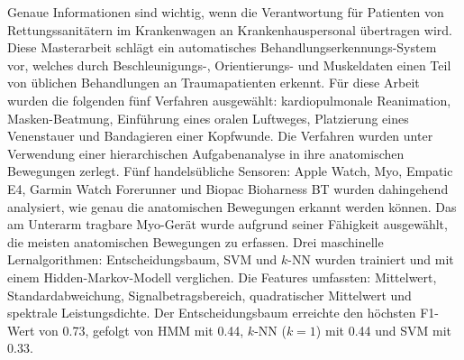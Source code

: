 
\Abstract
Genaue Informationen sind wichtig, wenn die Verantwortung für Patienten von Rettungssanitätern im Krankenwagen an Krankenhauspersonal übertragen wird. Diese Masterarbeit schlägt ein automatisches Behandlungserkennungs-System vor, welches durch Beschleunigungs-, Orientierungs- und Muskeldaten einen Teil von üblichen Behandlungen an Traumapatienten erkennt. Für diese Arbeit wurden die folgenden fünf Verfahren ausgewählt: kardiopulmonale Reanimation, Masken-Beatmung, Einführung eines oralen Luftweges, Platzierung eines Venenstauer und Bandagieren einer Kopfwunde. Die Verfahren wurden unter Verwendung einer hierarchischen Aufgabenanalyse in ihre anatomischen Bewegungen zerlegt. Fünf handelsübliche Sensoren:  Apple Watch, Myo, Empatic E4, Garmin Watch Forerunner und Biopac Bioharness BT wurden dahingehend analysiert, wie genau die anatomischen Bewegungen erkannt werden können. Das am Unterarm tragbare Myo-Gerät wurde aufgrund seiner Fähigkeit ausgewählt, die meisten anatomischen Bewegungen zu erfassen. Drei maschinelle Lernalgorithmen: Entscheidungsbaum, SVM und $k$-NN wurden trainiert und mit einem Hidden-Markov-Modell verglichen. Die Features umfassten: Mittelwert, Standardabweichung, Signalbetragsbereich, quadratischer Mittelwert und spektrale Leistungsdichte. Der Entscheidungsbaum erreichte den höchsten F1-Wert von 0.73, gefolgt von HMM mit 0.44, $k$-NN ($k=1$) mit 0.44 und SVM mit 0.33.